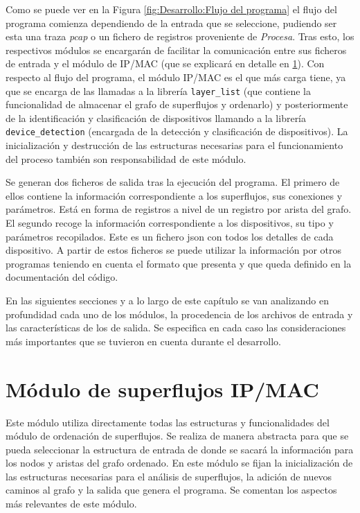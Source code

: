 \documentclass[tfg,epsbased,lof,lot,loa,covers,final,copyright,overleaf]{tfgtfmthesisuam}
\begin{document}
Como se puede ver en la Figura \ref{fig:Desarrollo:Flujo del programa} el flujo del programa comienza dependiendo de la entrada que se seleccione, pudiendo ser esta una traza \textit{pcap} o un fichero de registros proveniente de \textit{Procesa}. Tras esto, los respectivos módulos se encargarán de facilitar la comunicación entre sus ficheros de entrada y el módulo de IP/MAC (que se explicará en detalle en \ref{sec:Desarrollo:IPMAC}). Con respecto al flujo del programa, el módulo IP/MAC es el que más carga tiene, ya que se encarga de las llamadas a la librería \texttt{layer\_list} (que contiene la funcionalidad de almacenar el grafo de superflujos y ordenarlo) y posteriormente de la identificación y clasificación de dispositivos llamando a la librería \texttt{device\_detection} (encargada de la detección y clasificación de dispositivos). La inicialización y destrucción de las estructuras necesarias para el funcionamiento del proceso también son responsabilidad de este módulo.

Se generan dos ficheros de salida tras la ejecución del programa. El primero de ellos contiene la información correspondiente a los superflujos, sus conexiones y parámetros. Está en forma de registros a nivel de un registro por arista del grafo. El segundo recoge la información correspondiente a los dispositivos, su tipo y parámetros recopilados. Este es un fichero \gls{json} con todos los detalles de cada dispositivo. A partir de estos ficheros se puede utilizar la información por otros programas teniendo en cuenta el formato que presenta y que queda definido en la documentación del código.

En las siguientes secciones y a lo largo de este capítulo se van analizando en profundidad cada uno de los módulos, la procedencia de los archivos de entrada y las características de los de salida. Se especifica en cada caso las consideraciones más importantes que se tuvieron en cuenta durante el desarrollo.

\section{Módulo de superflujos IP/MAC}
\label{sec:Desarrollo:IPMAC}
Este módulo utiliza directamente todas las estructuras y funcionalidades del módulo de ordenación de superflujos. Se realiza de manera abstracta para que se pueda seleccionar la estructura de entrada de donde se sacará la información para los nodos y aristas del grafo ordenado. En este módulo se fijan la inicialización de las estructuras necesarias para el análisis de superflujos, la adición de nuevos caminos al grafo y la salida que genera el programa. Se comentan los aspectos más relevantes de este módulo.
\end{document}
